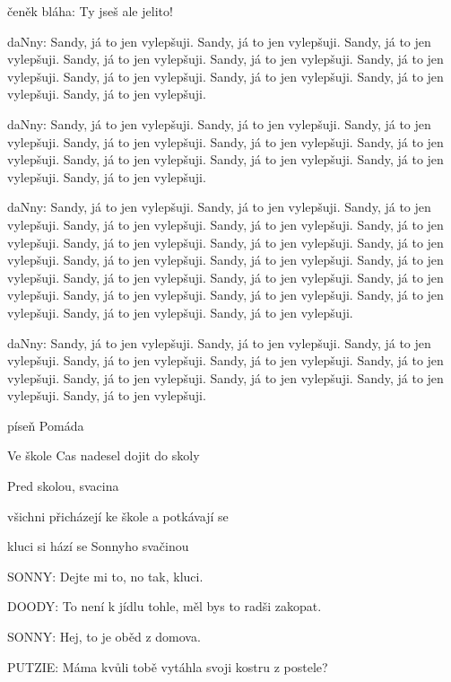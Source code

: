 
\rep čeněk bláha: Ty jseš ale jelito!

\rep daNny: Sandy, já to jen vylepšuji. Sandy, já to jen vylepšuji. Sandy, já to jen vylepšuji. Sandy, já to jen vylepšuji. Sandy, já to jen vylepšuji. Sandy, já to jen vylepšuji. Sandy, já to jen vylepšuji. Sandy, já to jen vylepšuji. Sandy, já to jen vylepšuji. Sandy, já to jen vylepšuji. 


\rep daNny: Sandy, já to jen vylepšuji. Sandy, já to jen vylepšuji. Sandy, já to jen vylepšuji. Sandy, já to jen vylepšuji. Sandy, já to jen vylepšuji. Sandy, já to jen vylepšuji. Sandy, já to jen vylepšuji. Sandy, já to jen vylepšuji. Sandy, já to jen vylepšuji. Sandy, já to jen vylepšuji. 

\rep daNny: Sandy, já to jen vylepšuji. Sandy, já to jen vylepšuji. Sandy, já to jen vylepšuji. Sandy, já to jen vylepšuji. Sandy, já to jen vylepšuji. Sandy, já to jen vylepšuji. Sandy, já to jen vylepšuji. Sandy, já to jen vylepšuji. Sandy, já to jen vylepšuji. Sandy, já to jen vylepšuji. 
Sandy, já to jen vylepšuji. Sandy, já to jen vylepšuji. Sandy, já to jen vylepšuji. Sandy, já to jen vylepšuji. Sandy, já to jen vylepšuji.
Sandy, já to jen vylepšuji. Sandy, já to jen vylepšuji. Sandy, já to jen vylepšuji. Sandy, já to jen vylepšuji. Sandy, já to jen vylepšuji.

\rep daNny: Sandy, já to jen vylepšuji. Sandy, já to jen vylepšuji. Sandy, já to jen vylepšuji. Sandy, já to jen vylepšuji. Sandy, já to jen vylepšuji. Sandy, já to jen vylepšuji. Sandy, já to jen vylepšuji. Sandy, já to jen vylepšuji. Sandy, já to jen vylepšuji. Sandy, já to jen vylepšuji. 

\pop píseň Pomáda

\act Ve škole
Cas nadesel dojit do skoly

\scene Pred skolou, svacina

\pop všichni přicházejí ke škole a potkávají se

\pop kluci si hází se Sonnyho svačinou

\rep SONNY:        Dejte mi to, no tak, kluci.

\rep DOODY:        To není k jídlu tohle, měl bys to radši zakopat.

\rep SONNY:        Hej, to je oběd z domova.

\rep PUTZIE:        Máma kvůli tobě vytáhla svoji kostru z postele?

